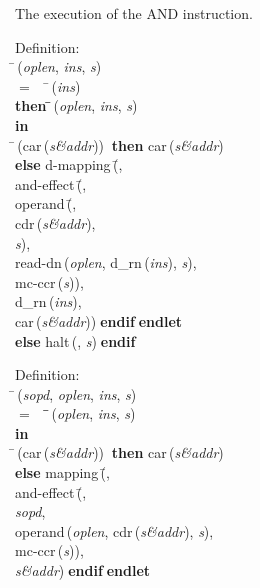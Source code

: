  The execution of the AND instruction.
\begin{tabbing}{\sc Definition}: \\  
\=\,({\it{oplen\/}}, {\it{ins\/}}, {\it{s\/}}) \\ 
$=$$\;\;\;\;$\=\,({\it{ins\/}}) \\ 
{\bf then }\=\=\,({\it{oplen\/}}, {\it{ins\/}}, {\it{s\/}})\- \\ 
{\bf in} \\ 
\=\,({\rm{car}}\,({\it{s\&addr\/}}))$\;\;${\bf then }{\rm{car}}\,({\it{s\&addr\/}}) \\ 
{\bf else }{\rm{d-mapping}}\,(\=, \\ 
{\rm{and-effect}}\,(\=, \\ 
{\rm{operand}}\,(\=, \\ 
{\rm{cdr}}\,({\it{s\&addr\/}}), \\ 
{\it{s\/}})\-, \\ 
{\rm{read-dn}}\,({\it{oplen\/}}, {\rm{d\_rn}}\,({\it{ins\/}}), {\it{s\/}}), \\ 
{\rm{mc-ccr}}\,({\it{s\/}}))\-, \\ 
{\rm{d\_rn}}\,({\it{ins\/}}), \\ 
{\rm{car}}\,({\it{s\&addr\/}}))\-$\;${\bf  endif}\-$\;${\bf  endlet}\- \\ 
{\bf else }{\rm{halt}}\,({}, {\it{s\/}})$\;${\bf  endif}\-\-
\end{tabbing}

\begin{tabbing}{\sc Definition}: \\  
\=\,({\it{sopd\/}}, {\it{oplen\/}}, {\it{ins\/}}, {\it{s\/}}) \\ 
$=$$\;\;\;\;$\=\=\,({\it{oplen\/}}, {\it{ins\/}}, {\it{s\/}})\- \\ 
{\bf in} \\ 
\=\,({\rm{car}}\,({\it{s\&addr\/}}))$\;\;${\bf then }{\rm{car}}\,({\it{s\&addr\/}}) \\ 
{\bf else }{\rm{mapping}}\,(\=, \\ 
{\rm{and-effect}}\,(\=, \\ 
{\it{sopd\/}}, \\ 
{\rm{operand}}\,({\it{oplen\/}}, {\rm{cdr}}\,({\it{s\&addr\/}}), {\it{s\/}}), \\ 
{\rm{mc-ccr}}\,({\it{s\/}}))\-, \\ 
{\it{s\&addr\/}})\-$\;${\bf  endif}\-$\;${\bf  endlet}\-\-
\end{tabbing}

